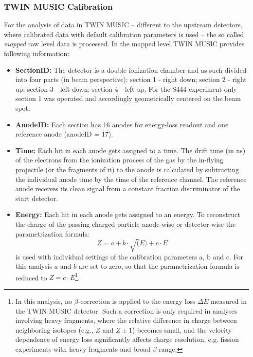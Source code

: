 \subsubsection{TWIN MUSIC Calibration}
For the analysis of data in TWIN MUSIC -- different to the upstream detectors, where calibrated data with default calibration parameters is used -- the so called \textit{mapped} raw level data is processed. In the mapped level TWIN MUSIC provides following information:
\begin{itemize}
\itemsep0em 
\item \textbf{SectionID:} The detector is a double ionization chamber and as such divided into four parts (in beam perspective): section 1 - right down; section 2 - right up; section 3 - left down; section 4 - left up. For the S444 experiment only section 1 was operated and accordingly geometrically centered on the beam spot.
\item \textbf{AnodeID:} Each section has 16 anodes for energy-loss readout and one reference anode (anodeID = 17).
\item \textbf{Time:} Each hit in each anode gets assigned to a time. The drift time (in ns) of the electrons from the ionization process of the gas by the in-flying projectile (or the fragments of it) to the anode is calculated by subtracting the individual anode time by the time of the reference channel. The reference anode receives its clean signal from a constant fraction discriminator of the start detector.
\item \textbf{Energy:} Each hit in each anode gets assigned to an energy. To reconstruct the charge of the passing charged particle anode-wise or detector-wise the parametrization formula: 
\begin{equation}\label{eq:param_z}
Z = a + b \cdot \sqrt(E) + c \cdot E
\end{equation}
is used with individual settings of the calibration parameters a, b and c. For this analysis $a$ and $b$ are set to zero, so that the parametrization formula is reduced to $ Z = c \cdot E $\footnote{In this analysis, no \(\beta\)-correction is applied to the energy loss \(\Delta E\) measured in the TWIN MUSIC detector. Such a correction is only required in analyses involving heavy fragments, where the relative difference in charge between neighboring isotopes (e.g., \(Z\) and \(Z \pm 1\)) becomes small, and the velocity dependence of energy loss significantly affects charge resolution, e.g. fission experiments with heavy fragments and broad \(\beta\)-range.}. 
\end{itemize}

